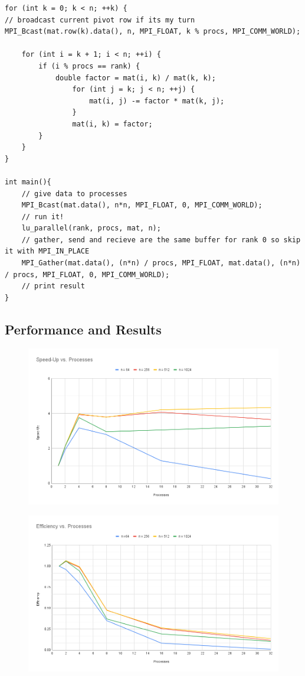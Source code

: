 \documentclass[12pt,letterpaper]{article}
\begin{document}
\begin{lstlisting}
for (int k = 0; k < n; ++k) {
// broadcast current pivot row if its my turn
MPI_Bcast(mat.row(k).data(), n, MPI_FLOAT, k % procs, MPI_COMM_WORLD);

    for (int i = k + 1; i < n; ++i) {
        if (i % procs == rank) {
            double factor = mat(i, k) / mat(k, k);
                for (int j = k; j < n; ++j) {
                    mat(i, j) -= factor * mat(k, j);
                }
                mat(i, k) = factor;
        }
    }
}

int main(){
    // give data to processes
    MPI_Bcast(mat.data(), n*n, MPI_FLOAT, 0, MPI_COMM_WORLD);
    // run it!
    lu_parallel(rank, procs, mat, n);
    // gather, send and recieve are the same buffer for rank 0 so skip it with MPI_IN_PLACE
    MPI_Gather(mat.data(), (n*n) / procs, MPI_FLOAT, mat.data(), (n*n) / procs, MPI_FLOAT, 0, MPI_COMM_WORLD);
    // print result
}
\end{lstlisting}
\subsection{Performance and Results}

\begin{figure}
    \centering
    \includegraphics[width=0.9\linewidth]{"Speed-Up vs. Processes"}
    \caption{}
    \label{fig:speed-up-mpi}
\end{figure}

\begin{figure}
    \centering
    \includegraphics[width=0.9\linewidth]{"Efficiency vs. Processes"}
    \caption{}
    \label{fig:efficiency-mpi}
\end{figure}

\printbibliography
\end{document}
